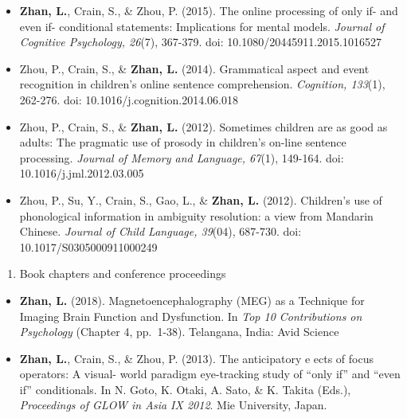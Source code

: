 \documentclass[12pt,]{article}
\providecommand{\tightlist}{%
  \setlength{\itemsep}{0pt}\setlength{\parskip}{0pt}}
\begin{document}
\begin{itemize}
{  44}(5), 1025-1040. doi: 10.1017/S0305000916000313
  \href{https://publications.likan.info/Periodicals/JChildLang2016.pdf}{
  \faFilePdf[regular] }
\item
  \textbf{Zhan, L.}, Crain, S., \& Zhou, P. (2015). The online
  processing of only if- and even if- conditional statements:
  Implications for mental models. \emph{Journal of Cognitive Psychology,
  26}(7), 367-379. doi: 10.1080/20445911.2015.1016527
  \href{https://publications.likan.info/Periodicals/JCognPsychol2015.pdf}{
  \faFilePdf[regular] }
\item
  Zhou, P., Crain, S., \& \textbf{Zhan, L.} (2014). Grammatical aspect
  and event recognition in children's online sentence comprehension.
  \emph{Cognition, 133}(1), 262-276. doi:
  10.1016/j.cognition.2014.06.018
  \href{http://publications.likan.info/Periodicals/Cognition2014.pdf}{
  \faFilePdf[regular] }
\item
  Zhou, P., Crain, S., \& \textbf{Zhan, L.} (2012). Sometimes children
  are as good as adults: The pragmatic use of prosody in children's
  on-line sentence processing. \emph{Journal of Memory and Language,
  67}(1), 149-164. doi: 10.1016/j.jml.2012.03.005
  \href{https://publications.likan.info/Periodicals/JMemLang2012.pdf}{
  \faFilePdf[regular] }
\item
  Zhou, P., Su, Y., Crain, S., Gao, L., \& \textbf{Zhan, L.} (2012).
  Children's use of phonological information in ambiguity resolution: a
  view from Mandarin Chinese. \emph{Journal of Child Language, 39}(04),
  687-730. doi: 10.1017/S0305000911000249
  \href{https://publications.likan.info/Periodicals/JChildLang2012.pdf}{
  \faFilePdf[regular] }
\end{itemize}

\begin{enumerate}
\def\labelenumi{\arabic{enumi}.}
\setcounter{enumi}{2}
\tightlist
\item
  Book chapters and conference proceedings
\end{enumerate}

\begin{itemize}
\item
  \textbf{Zhan, L.} (2018). Magnetoencephalography (MEG) as a Technique
  for Imaging Brain Function and Dysfunction. In \emph{Top 10
  Contributions on Psychology} (Chapter 4, pp.~1-38). Telangana, India:
  Avid Science
\item
  \textbf{Zhan, L.}, Crain, S., \& Zhou, P. (2013). The anticipatory e
  ects of focus operators: A visual- world paradigm eye-tracking study
  of ``only if'' and ``even if'' conditionals. In N. Goto, K. Otaki, A.
  Sato, \& K. Takita (Eds.), \emph{Proceedings of GLOW in Asia IX 2012}.
  Mie University, Japan.
\end{itemize}
\end{document}
